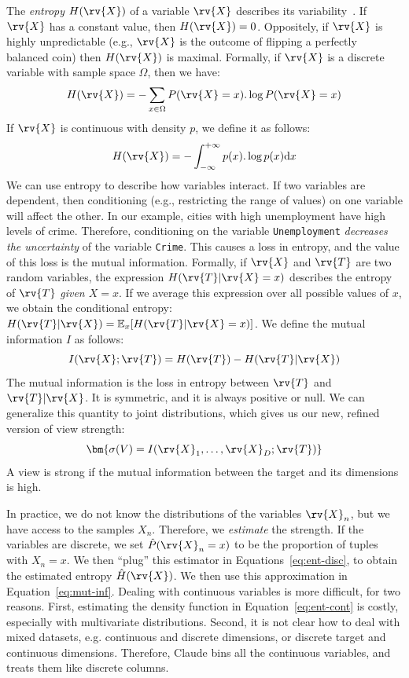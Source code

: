 The \emph{entropy} $H(\rv{X})$ of a variable $\rv{X}$ describes its
variabi\-lity~\cite{cover2012elements}. If $\rv{X}$ has a constant value, then $H(\rv{X}) = 0$.
Oppositely, if $\rv{X}$ is highly unpredictable (e.g., $\rv{X}$ is
the outcome of flipping a perfectly balanced coin) then $H(\rv{X})$ is
maximal. Formally, if $\rv{X}$ is a discrete variable with sample space
$\Omega$, then we have:
\begin{equation}\label{eq:ent-disc}
    H(\rv{X}) = - \sum_{x\in \Omega} P(\rv{X} = x).\log{P(\rv{X} = x)}
\end{equation}
If $\rv{X}$ is continuous with density $p$, we define it as follows:
\begin{equation}\label{eq:ent-cont}
    H(\rv{X}) = - \int_{-\infty}^{+\infty} p(x).\log{p(x)}\mathrm{d}x
\end{equation}
We can use entropy to describe how variables interact. If two variables are
dependent, then conditioning (e.g., restricting the range of values) on one
variable will affect the other. In our example, cities with high unemployment
have high levels of crime.  Therefore, conditioning on the variable
\texttt{Unemployment} \emph{decreases the uncertainty} of the variable
\texttt{Crime}. This causes a loss in entropy, and the value of this loss is
the mutual information.  Formally, if $\rv{X}$ and $\rv{T}$ are two
random variables, the expression $H(\rv{T} | \rv{X} = x)$ describes the entropy
of $\rv{T}$ \emph{given $X = x$}. If we average this expression over all
possible values of $x$, we obtain the conditional entropy: $H(\rv{T}|\rv{X}) =
\mathbb{E}_{x} [H(\rv{T} | \rv{X} = x)]$. We define the mutual information $I$
as follows:
\begin{equation}\label{eq:mut-inf}
    I(\rv{X}; \rv{T}) = H(\rv{T}) - H(\rv{T} | \rv{X})
\end{equation}
The mutual information is the loss in entropy between $\rv{T}$ and $\rv{T} |
\rv{X}$. It is symmetric, and it is always positive or null. We can generalize
this quantity to joint distributions, which gives us our new, refined version of
view strength:
\begin{equation}\label{eq:strength}\bm{
    \sigma(V) = I(\rv{X}_1, \ldots, \rv{X}_D ; \rv{T})
}\end{equation}
A view is strong if the mutual information between the target and its
dimensions is high.

In practice, we do not know the distributions of the variables $\rv{X}_n$, but
we have access to the samples $X_n$. Therefore, we \emph{estimate} the
strength. If the variables are discrete, we set $\hat{P}(\rv{X}_n = x)$ to be
the proportion of tuples with $X_n=x$. We then ``plug'' this estimator in
Equations~\ref{eq:ent-disc}, to obtain the estimated entropy $\hat{H}(\rv{X})$.
We then use this approximation in Equation~\ref{eq:mut-inf}.  Dealing with
continuous variables is more difficult, for two reasons. First, estimating the
density function in Equation~\ref{eq:ent-cont} is costly, especially with
multivariate distributions.  Second, it is not clear how to deal with mixed
datasets, e.g.  continuous and discrete dimensions, or discrete target and
continuous dimensions.  Therefore, Claude bins all the continuous variables,
and treats them like discrete columns.

